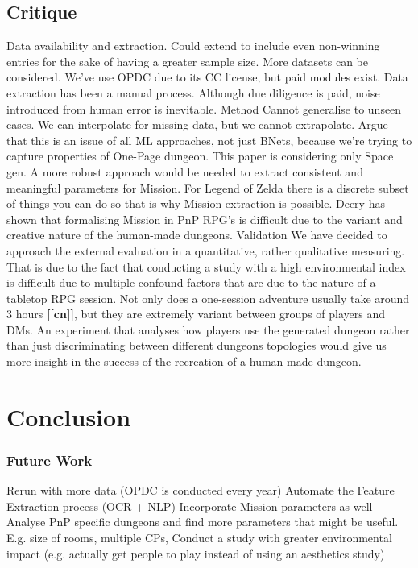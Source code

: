 \documentclass{UoYCSproject}
\begin{document}
\section{Critique}
\begin{outline}[enumerate]
  \1 Data
    \2 availability and extraction. 
      \3 Could extend to include even non-winning entries for the sake of having a greater sample size. More datasets can be considered. We've use OPDC due to its CC license, but paid modules exist.
      \3 Data extraction has been a manual process. Although due diligence is paid, noise introduced from human error is inevitable. 
  \1 Method
    \2 Cannot generalise to unseen cases. We can interpolate for missing data, but we cannot extrapolate. Argue that this is an issue of all ML approaches, not just BNets, because we're trying to capture properties of One-Page dungeon.
    \2 This paper is considering only Space gen. A more robust approach would be needed to extract consistent and meaningful parameters for Mission. For Legend of Zelda there is a discrete subset of things you can do so that is why Mission extraction is possible. Deery has shown that formalising Mission in PnP RPG's is difficult due to the variant and creative nature of the human-made dungeons.
  \1 Validation
    \2 We have decided to approach the external evaluation in a quantitative, rather qualitative measuring. That is due to the fact that conducting a study with a high environmental index is difficult due to multiple confound factors that are due to the nature of a tabletop RPG session. Not only does a one-session adventure usually take around 3 hours \textbf{[[cn]]}, but they are extremely variant between groups of players and DMs. An experiment that analyses how players use the generated dungeon rather than just discriminating between different dungeons topologies would give us more insight in the success of the recreation of a human-made dungeon.
  
\end{outline}

\chapter{Conclusion}
\label{cha:conclusion}

\subsection{Future Work}
\begin{outline}[enumerate]
  \1 Rerun with more data (OPDC is conducted every year)
  \1 Automate the Feature Extraction process (OCR + NLP)
  \1 Incorporate Mission parameters as well
  \1 Analyse PnP specific dungeons and find more parameters that might be useful. E.g. size of rooms, multiple CPs, 
  \1 Conduct a study with greater environmental impact (e.g. actually get people to play instead of using an aesthetics study)
\end{outline}
\end{document}
